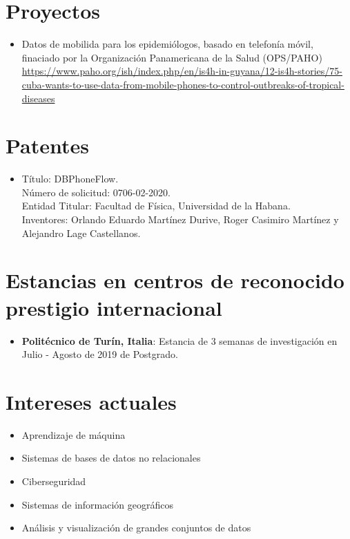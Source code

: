 \documentclass[11pt]{article} %
\begin{document}
\section*{Proyectos}
\begin{itemize}
	\item Datos de mobilida para los epidemiólogos, basado en telefon\'ia m\'ovil, finaciado por la Organizaci\'on Panamericana de la Salud (OPS/PAHO)\\ \href{https://www.paho.org/ish/index.php/en/is4h-in-guyana/12-is4h-stories/75-cuba-wants-to-use-data-from-mobile-phones-to-control-outbreaks-of-tropical-diseases}{https://www.paho.org/ish/index.php/en/is4h-in-guyana/12-is4h-stories/75-cuba-wants-to-use-data-from-mobile-phones-to-control-outbreaks-of-tropical-diseases}
\end{itemize}

\section*{Patentes}
\begin{itemize}
	\item T\'itulo: DBPhoneFlow. \\ 
	N\'umero de solicitud: 0706-02-2020. \\
	Entidad Titular: Facultad de Física, Universidad de la Habana. \\
	Inventores: Orlando Eduardo Martínez Durive, Roger Casimiro Martínez y Alejandro Lage Castellanos.
\end{itemize}

\section*{Estancias en centros de reconocido prestigio internacional}
\begin{itemize}
	\item {\bf Polit\'ecnico de Tur\'in, Italia}: Estancia de 3 semanas de investigaci\'on en Julio - Agosto de 2019 de Postgrado.
\end{itemize}

\section*{Intereses actuales}
\begin{itemize}
	\item Aprendizaje de m\'aquina
	\item Sistemas de bases de datos no relacionales
	\item Ciberseguridad
	\item Sistemas de informaci\'on geogr\'aficos
	\item An\'alisis y visualizaci\'on de grandes conjuntos de datos
\end{itemize}
\end{document}
